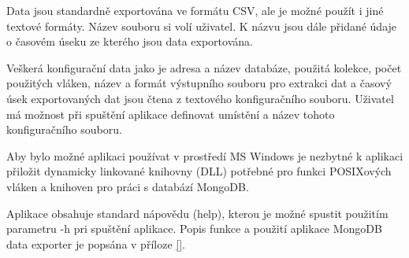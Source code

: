 Data jsou standardně exportována ve formátu CSV, ale je možné použít i jiné textové formáty. Název souboru si volí uživatel. K názvu jsou dále přidané údaje o časovém úseku ze kterého jsou data exportována.

Veškerá konfigurační data jako je adresa a název databáze, použitá kolekce, počet použitých vláken, název a formát výstupního souboru pro extrakci dat a časový úsek exportovaných dat jsou čtena z textového konfiguračního souboru. Uživatel má možnost při spuštění aplikace definovat umístění a název tohoto konfiguračního souboru. 

Aby bylo možné aplikaci používat v prostředí MS Windows je nezbytné k aplikaci přiložit dynamicky linkované knihovny (DLL) potřebné pro funkci POSIXových vláken a knihoven pro práci s databází MongoDB.   

Aplikace obsahuje standard nápovědu (help), kterou je možné spustit použitím parametru -h pri spuštění aplikace. Popis funkce a použití aplikace MongoDB data exporter je popsána v příloze \ref{}.